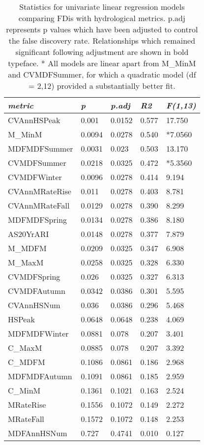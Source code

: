 \documentclass[openright,12pt,a4paper]{memoir}
\begin{document}
\doublespacing


\begin{table}[ht]
\tiny
\centering
\caption[Statistics for univariate linear regression models.]{\small{Statistics for univariate linear regression models comparing FDis with hydrological metrics. p.adj represents p values which have been adjusted to control the false discovery rate. Relationships which remained significant following adjustment are shown in bold typeface. * All models are linear apart from M\_MinM and CVMDFSummer, for which a quadratic model (df = 2,12) provided a substantially better fit.}} \\
\label{Ch3sup4_T1} \\
{\tabulinesep=1.2mm
\begin{tabu} to 
\hline
\textit{metric} & \textit{p} & \textit{p.adj} & \textit{R2} & \textit{F(1,13)} \\
\hline
CVAnnHSPeak & 0.001 & 0.0152 & 0.577 & 17.750 \\
M\_MinM & 0.0094 & 0.0278 & 0.540 & *7.0560 \\
MDFMDFSummer & 0.0031 & 0.023 & 0.503 & 13.170 \\
CVMDFSummer & 0.0218 & 0.0325 & 0.472 & *5.3560 \\
CVMDFWinter & 0.0096 & 0.0278 & 0.414 & 9.194 \\
CVAnnMRateRise & 0.011 & 0.0278 & 0.403 & 8.781 \\
CVAnnMRateFall & 0.0129 & 0.0278 & 0.390 & 8.299 \\
MDFMDFSpring & 0.0134 & 0.0278 & 0.386 & 8.180 \\
AS20YrARI & 0.0148 & 0.0278 & 0.377 & 7.879 \\
M\_MDFM & 0.0209 & 0.0325 & 0.347 & 6.908 \\
M\_MaxM & 0.0258 & 0.0325 & 0.328 & 6.330 \\
CVMDFSpring & 0.026 & 0.0325 & 0.327 & 6.313 \\
CVMDFAutumn & 0.0342 & 0.0386 & 0.301 & 5.595 \\
CVAnnHSNum & 0.036 & 0.0386 & 0.296 & 5.468 \\
HSPeak & 0.0648 & 0.0648 & 0.238 & 4.069 \\
MDFMDFWinter & 0.0881 & 0.078 & 0.207 & 3.401 \\
C\_MaxM & 0.0885 & 0.078 & 0.207 & 3.392 \\
C\_MDFM & 0.1086 & 0.0861 & 0.186 & 2.968 \\
MDFMDFAutumn & 0.1091 & 0.0861 & 0.185 & 2.959 \\
C\_MinM & 0.1361 & 0.1021 & 0.163 & 2.524 \\
MRateRise & 0.1556 & 0.1072 & 0.149 & 2.272 \\
MRateFall & 0.1572 & 0.1072 & 0.148 & 2.253 \\
MDFAnnHSNum & 0.727 & 0.4741 & 0.010 & 0.127 \\
\hline
\end{tabu}}
\end{table}

\clearpage
\end{document}
